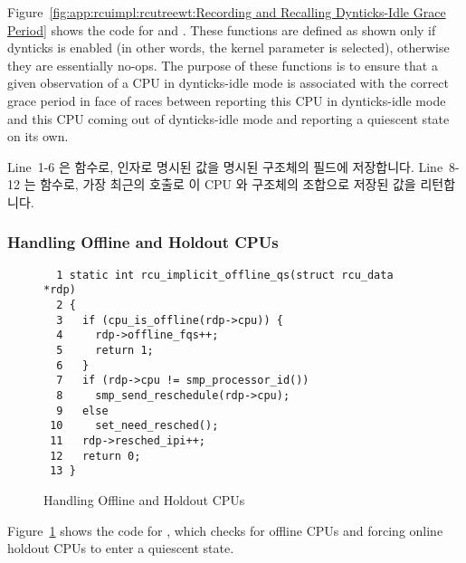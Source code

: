 Figure~\ref{fig:app:rcuimpl:rcutreewt:Recording and Recalling Dynticks-Idle Grace Period}
shows the code for  and
.
These functions are defined as shown only if dynticks
is enabled (in other words, the  kernel parameter
is selected), otherwise they are essentially no-ops.
The purpose of these functions is to ensure that a given observation
of a CPU in dynticks-idle mode is associated with the correct
grace period in face of races between reporting this CPU in
dynticks-idle mode and this CPU coming out of dynticks-idle mode
and reporting a quiescent state on its own.
\fi

Line~1-6 은  함수로,  인자로 명시된
값을 명시된  구조체의  필드에
저장합니다.
Line~8-12 는  함수로, 가장 최근의
 호출로 이 CPU 와  구조체의
조합으로 저장된 값을 리턴합니다.
\iffalse

Lines~1-6 show \co{dyntick_record_completed()}, which stores the
value specified by its \co{comp} argument into the specified
\co{rcu_state} structure's \co{->dynticks_completed} field.
Lines~8-12 show \co{dyntick_recall_completed()}, which returns
the value stored by the most recent call to
\co{dyntick_record_completed()} for this combination of CPU and
\co{rcu_state} structure.
\fi

\subsubsection{Handling Offline and Holdout CPUs}
\label{app:rcuimpl:rcutreewt:Handling Offline and Holdout CPUs}

\begin{figure}[tbp]
{ \scriptsize
\begin{verbatim}
  1 static int rcu_implicit_offline_qs(struct rcu_data *rdp)
  2 {
  3   if (cpu_is_offline(rdp->cpu)) {
  4     rdp->offline_fqs++;
  5     return 1;
  6   }
  7   if (rdp->cpu != smp_processor_id())
  8     smp_send_reschedule(rdp->cpu);
  9   else
 10     set_need_resched();
 11   rdp->resched_ipi++;
 12   return 0;
 13 }
\end{verbatim}
}
\caption{Handling Offline and Holdout CPUs}
\label{fig:app:rcuimpl:rcutreewt:Handling Offline and Holdout CPUs}
\end{figure}

Figure~\ref{fig:app:rcuimpl:rcutreewt:Handling Offline and Holdout CPUs}
shows the code for , which checks for
offline CPUs and forcing online holdout CPUs to enter a quiescent state.

